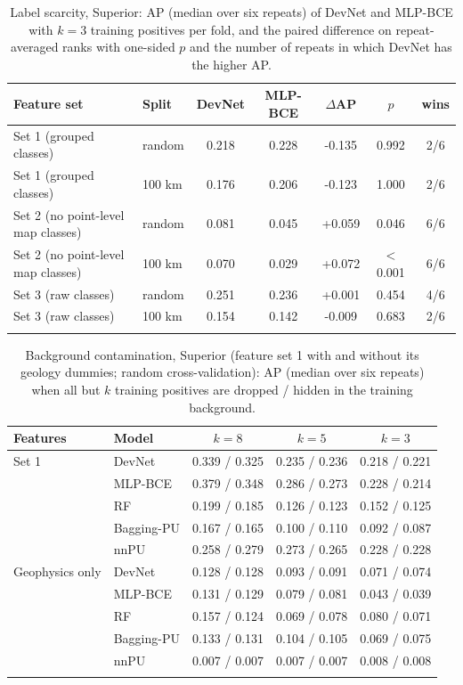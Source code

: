 \documentclass[pdflatex,sn-apa]{sn-jnl}
\begin{document}
\begin{table}[t]
\caption{Label scarcity, Superior: AP (median over six repeats) of DevNet and MLP-BCE with $k = 3$ training positives per fold, and the paired difference on repeat-averaged ranks with one-sided $p$ and the number of repeats in which DevNet has the higher AP.}\label{tab:scarcity}
\footnotesize
\setlength{\tabcolsep}{3pt}
\begin{tabular*}{\textwidth}{@{\extracolsep\fill}llccccc}
\toprule
Feature set & Split & DevNet & MLP-BCE & $\Delta$AP & $p$ & wins \\
\midrule
Set 1 (grouped classes) & random & 0.218 & 0.228 & -0.135 & 0.992 & 2/6 \\
Set 1 (grouped classes) & 100 km & 0.176 & 0.206 & -0.123 & 1.000 & 2/6 \\
Set 2 (no point-level map classes) & random & 0.081 & 0.045 & +0.059 & 0.046 & 6/6 \\
Set 2 (no point-level map classes) & 100 km & 0.070 & 0.029 & +0.072 & $<$0.001 & 6/6 \\
Set 3 (raw classes) & random & 0.251 & 0.236 & +0.001 & 0.454 & 4/6 \\
Set 3 (raw classes) & 100 km & 0.154 & 0.142 & -0.009 & 0.683 & 2/6 \\
\botrule
\end{tabular*}
\end{table}

\begin{table}[t]
\caption{Background contamination, Superior (feature set 1 with and without its geology dummies; random cross-validation): AP (median over six repeats) when all but $k$ training positives are dropped / hidden in the training background.}\label{tab:contamination}
\footnotesize
\begin{tabular*}{\textwidth}{@{\extracolsep\fill}llccc}
\toprule
Features & Model & $k = 8$ & $k = 5$ & $k = 3$ \\
\midrule
Set 1 & DevNet & 0.339 / 0.325 & 0.235 / 0.236 & 0.218 / 0.221 \\
 & MLP-BCE & 0.379 / 0.348 & 0.286 / 0.273 & 0.228 / 0.214 \\
 & RF & 0.199 / 0.185 & 0.126 / 0.123 & 0.152 / 0.125 \\
 & Bagging-PU & 0.167 / 0.165 & 0.100 / 0.110 & 0.092 / 0.087 \\
 & nnPU & 0.258 / 0.279 & 0.273 / 0.265 & 0.228 / 0.228 \\
\addlinespace
Geophysics only & DevNet & 0.128 / 0.128 & 0.093 / 0.091 & 0.071 / 0.074 \\
 & MLP-BCE & 0.131 / 0.129 & 0.079 / 0.081 & 0.043 / 0.039 \\
 & RF & 0.157 / 0.124 & 0.069 / 0.078 & 0.080 / 0.071 \\
 & Bagging-PU & 0.133 / 0.131 & 0.104 / 0.105 & 0.069 / 0.075 \\
 & nnPU & 0.007 / 0.007 & 0.007 / 0.007 & 0.008 / 0.008 \\
\botrule
\end{tabular*}
\end{table}
\end{document}
